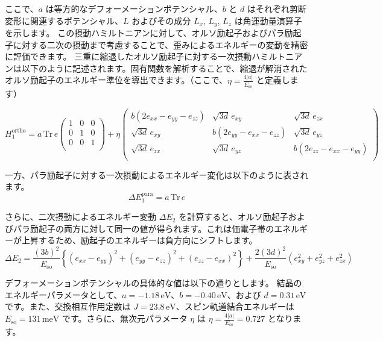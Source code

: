 ここで、$a$ は等方的なデフォーメーションポテンシャル、$b$ と $d$ はそれぞれ剪断変形に関連するポテンシャル、$L$ およびその成分 $L_x$, $L_y$, $L_z$ は角運動量演算子を示します。
この摂動ハミルトニアンに対して、オルソ励起子およびパラ励起子に対する二次の摂動まで考慮することで、歪みによるエネルギーの変動を精密に評価できます。
三重に縮退したオルソ励起子に対する一次摂動ハミルトニアンは以下のように記述されます。固有関数を解析することで、縮退が解消されたオルソ励起子のエネルギー準位を導出できます。（ここで、$\eta = \frac{4|a|}{E_{\text{so}}}$ と定義します）

\begin{equation}
H_1^{\text{ortho}} = a \, \text{Tr}\,e \begin{pmatrix}
1 & 0 & 0 \\
0 & 1 & 0 \\
0 & 0 & 1 \\
\end{pmatrix} + \eta \begin{pmatrix}
b(2e_{xx} - e_{yy} - e_{zz}) & \sqrt{3d}\,e_{xy} & \sqrt{3d}\,e_{zx} \\
\sqrt{3d}\,e_{xy} & b(2e_{yy} - e_{xx} - e_{zz}) & \sqrt{3d}\,e_{yz} \\
\sqrt{3d}\,e_{zx} & \sqrt{3d}\,e_{yz} & b(2e_{zz} - e_{xx} - e_{yy}) \\
\end{pmatrix}
\end{equation}

一方、パラ励起子に対する一次摂動によるエネルギー変化は以下のように表されます。
\begin{equation}
\Delta E_1^{\text{para}} = a \, \text{Tr}\,e
\end{equation}

さらに、二次摂動によるエネルギー変動 $\Delta E_2$ を計算すると、オルソ励起子およびパラ励起子の両方に対して同一の値が得られます。これは価電子帯のエネルギーが上昇するため、励起子のエネルギーは負方向にシフトします。
\begin{equation}
\Delta E_2 = \frac{(3b)^2}{E_{\text{so}}} \left\{(e_{xx} - e_{yy})^2 + (e_{yy} - e_{zz})^2 + (e_{zz} - e_{xx})^2 \right\} + \frac{2(3d)^2}{E_{\text{so}}} \left(e_{xy}^2 + e_{yz}^2 + e_{zx}^2\right)
\end{equation}

デフォーメーションポテンシャルの具体的な値は以下の通りとします。
結晶のエネルギーパラメータとして、\( a = -1.18 \, \text{eV} \)、\( b = -0.40 \, \text{eV} \)、および \( d = 0.31 \, \text{eV} \) です。また、交換相互作用定数は \( J = 23.8 \, \text{eV} \)、スピン軌道結合エネルギーは \( E_{\text{so}} = 131 \, \text{meV} \) です。さらに、無次元パラメータ \( \eta \) は \( \eta = \frac{4|a|}{E_{\text{so}}} = 0.727 \) となります。


